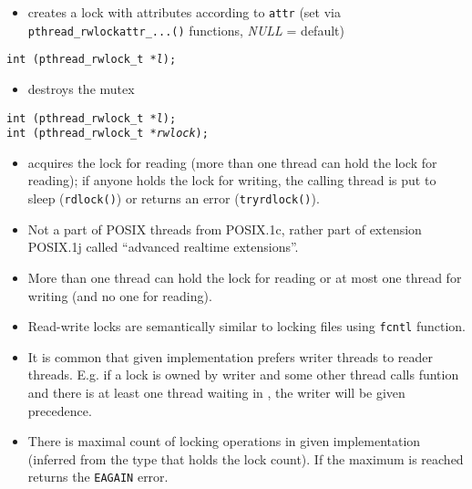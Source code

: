 \begin{slide}
\prgchars
{}
\begin{itemize}
\item creates a lock with attributes according to \texttt{attr}
(set via \texttt{pthread\_rwlockattr\_...()} functions, \emph{NULL} = default)
\end{itemize}
\texttt{int (pthread\_rwlock\_t *\emph{l});}
\begin{itemize}
\item destroys the mutex
\end{itemize}
\texttt{int (pthread\_rwlock\_t *\emph{l});}\\
\texttt{int (pthread\_rwlock\_t *\emph{rwlock});}
\begin{itemize}
\item acquires the lock for reading (more than one thread can hold the lock
for reading); if anyone holds the lock for writing, the calling thread is put
to sleep (\texttt{rdlock()}) or returns an error (\texttt{tryrdlock()}).
\end{itemize}
\end{slide}

\label{RWLOCKS}

\begin{itemize}
\item Not a part of POSIX threads from POSIX.1c, rather part of extension
POSIX.1j called ``advanced realtime extensions''.
\item More than one thread can hold the lock for reading or at most one
thread for writing (and no one for reading).
\item Read-write locks are semantically similar to locking files using
\texttt{fcntl} function.
\item It is common that given implementation prefers writer threads to
reader threads. E.g. if a lock is owned by writer and some other thread
calls funtion  and there is at least one thread
waiting in , the writer will be given precedence.
\item There is maximal count of locking operations in given implementation
(inferred from the type that holds the lock count). If the maximum is reached
 returns the \texttt{EAGAIN} error.
\end{itemize}

